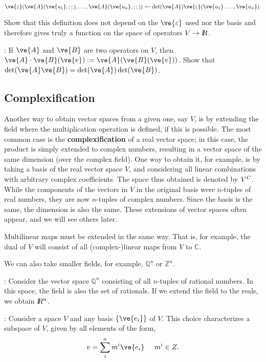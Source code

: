 \[ 
\ve{\varepsilon}(\ve{A}(\ve{u_1},;;),\ldots ,\ve{A}(\ve{u_n},;;)) =: \det(\ve{A}) \ve{\varepsilon}(\ve{u_1}. \ldots, \ve{u_n}).
\] %

\bpro Show that this definition does not depend on the $\ve{\varepsilon} $ used nor the basis and therefore gives truly a function on the space of operators $V \to \mbox{\sl {l$\!\!\!\;\:\!$R}}$. \epro

\ejer: If $\ve{A}$ and $\ve{B}$ are two operators on $V$, then $\ve{A}\cdot \ve{B} (\ve{v}):= \ve{A}(\ve{B}(\ve{v}))$. Show that $\det(\ve{A}\ve{B})=\det(\ve{A}) \det(\ve{B})$.

\subsection{Complexification}
\label{sub:Complexificacion}


Another way to obtain vector spaces from a given one, say $V$, is by extending the field where the multiplication operation is defined, if this is possible. The most common case is the \textbf{complexification} of a real vector space; in this case, the product is simply extended to complex numbers, resulting in a vector space of the same dimension (over the complex field). One way to obtain it, for example, is by taking a basis of the real vector space $V$, and considering all linear combinations with arbitrary complex coefficients. The space thus obtained is denoted by $V^{C}$. While the components of the vectors in $V$ in the original basis were $n$-tuples of real numbers, they are now $n$-tuples of complex numbers. Since the basis is the same, the dimension is also the same. These extensions of vector spaces often appear, and we will see others later.

Multilinear maps must be extended in the same way. That is, for example, the dual of $V$ will consist of all (complex-)linear maps from $V$ to $\mathbb{C}$.

We can also take smaller fields, for example, $\mathbb{Q}^n$ or $\mathbb{Z}^n$.

\ejem: Consider the vector space $\mathbb{Q}^n$ consisting of all $n$-tuples of rational numbers. In this space, the field is also the set of rationals. If we extend the field to the reals, we obtain $\mbox{\sl {l$\!\!\!\;\:\!$R}$^n$}$.

\ejem: Consider a space $V$ and any basis $\{\ve{e_{i}}\}$ of $V$. This choice characterizes a subspace of $V$, given by all elements of the form, 
\[ 
v=\sum_{i}^{n} m^{i}\ve{e_{i}} \;\;\;\;\; m^{i} \in Z. 
\]

